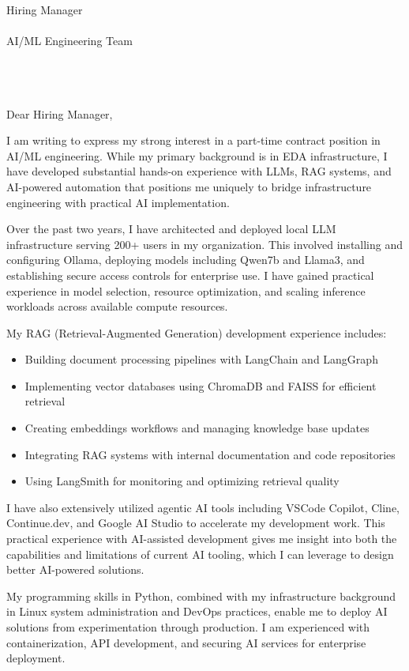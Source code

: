 \documentclass[11pt,a4paper]{letter}
\date{\today}
\begin{document}
\begin{letter}{
    Hiring Manager\\\\
    AI/ML Engineering Team\\\\
    [Company Name]\\\\
    [Company Address]
}

\opening{Dear Hiring Manager,}

I am writing to express my strong interest in a part-time contract position in AI/ML engineering. While my primary background is in EDA infrastructure, I have developed substantial hands-on experience with LLMs, RAG systems, and AI-powered automation that positions me uniquely to bridge infrastructure engineering with practical AI implementation.

Over the past two years, I have architected and deployed local LLM infrastructure serving 200+ users in my organization. This involved installing and configuring Ollama, deploying models including Qwen7b and Llama3, and establishing secure access controls for enterprise use. I have gained practical experience in model selection, resource optimization, and scaling inference workloads across available compute resources.

My RAG (Retrieval-Augmented Generation) development experience includes:
\begin{itemize}
    \item Building document processing pipelines with LangChain and LangGraph
    \item Implementing vector databases using ChromaDB and FAISS for efficient retrieval
    \item Creating embeddings workflows and managing knowledge base updates
    \item Integrating RAG systems with internal documentation and code repositories
    \item Using LangSmith for monitoring and optimizing retrieval quality
\end{itemize}

I have also extensively utilized agentic AI tools including VSCode Copilot, Cline, Continue.dev, and Google AI Studio to accelerate my development work. This practical experience with AI-assisted development gives me insight into both the capabilities and limitations of current AI tooling, which I can leverage to design better AI-powered solutions.

My programming skills in Python, combined with my infrastructure background in Linux system administration and DevOps practices, enable me to deploy AI solutions from experimentation through production. I am experienced with containerization, API development, and securing AI services for enterprise deployment.


\end{letter}
\end{document}
